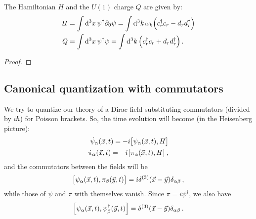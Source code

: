 \documentclass[main.tex]{subfiles}
\begin{document}


\begin{claim}
The Hamiltonian \(H\) and the \(U(1)\) charge \(Q\) are given by:
%
\begin{align}
    H &= \int \dd[3]{x} \psi ^\dag \partial_0 \psi  = \int \dd[3]{k} \omega_{k} \qty(c_r ^\dag c_r - d_r  d_r ^\dag)  \\
    Q &= \int \dd[3]{x} \psi ^\dag \psi = \int \dd[3]{k} \qty(c_r ^\dag c_r  + d_r d_r ^\dag) 
    \,.
\end{align}   
\end{claim}

\begin{proof}
\end{proof}

\subsection{Canonical quantization with commutators}

We try to quantize our theory of a Dirac field substituting commutators (divided by \(i \hbar\)) for Poisson brackets. So, the time evolution will become (in  the Heisenberg picture): 
%
\begin{align}
\dot{\psi}_{\alpha } (\vec{x}, t) =- i \qty[ \psi_{\alpha } (\vec{x}, t), H] \\
\dot{\pi}_{\alpha } (\vec{x}, t) =- i \qty[ \pi_{\alpha } (\vec{x}, t), H]
\,,
\end{align}
%
and the commutators between the fields will be 
%
\begin{align}
\qty[\psi_{\alpha }(\vec{x}, t), \pi_{\beta } (\vec{y}, t)] = i \delta^{(3)} (\vec{x} - \vec{y}) \delta_{\alpha \beta }
\,,
\end{align}
%
while those of \(\psi \) and \(\pi \) with themselves vanish. 
Since \(\pi  = i \psi ^\dag\), we also have 
%
\begin{align}
\qty[ \psi_{\alpha } (\vec{x}, t), \psi ^\dag_{\beta} (\vec{y}, t)] = \delta^{(3)} (\vec{x}- \vec{y}) \delta_{\alpha \beta }
\,.
\end{align}
\end{document}
